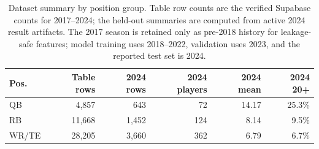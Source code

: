 \begin{table}[!htbp]
\caption{Dataset summary by position group. Table row counts are the verified Supabase counts for 2017--2024; the held-out summaries are computed from active 2024 result artifacts. The 2017 season is retained only as pre-2018 history for leakage-safe features; model training uses 2018--2022, validation uses 2023, and the reported test set is 2024.}
\label{tab:dataset}
\centering
\footnotesize
\begin{tabular}{lrrrrr}
\toprule
Pos. & Table rows & 2024 rows & 2024 players & 2024 mean & 2024 20+ \\
\midrule
QB & 4,857 & 643 & 72 & 14.17 & 25.3\% \\
RB & 11,668 & 1,452 & 124 & 8.14 & 9.5\% \\
WR/TE & 28,205 & 3,660 & 362 & 6.79 & 6.7\% \\
\bottomrule
\end{tabular}
\end{table}
